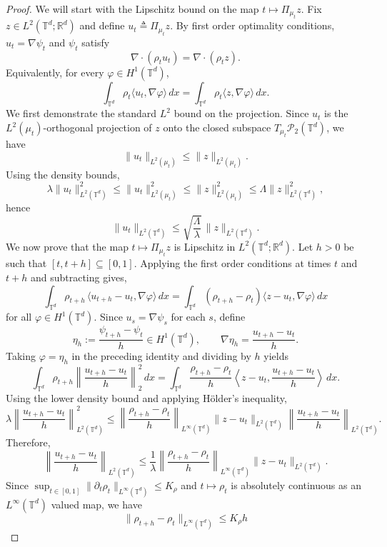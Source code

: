 \documentclass[10pt,a4paper]{amsart}
\begin{document}
\begin{proof}
We will start with the Lipschitz bound on the map $t \mapsto \Pi_{\mu_t}z$. Fix $z\in L^2(\mathbb{T}^d;\mathbb R^d)$ and define $u_t \triangleq \Pi_{\mu_t}z$. By first order optimality conditions, $u_t=\nabla \psi_t$ and $\psi_t$ satisfy
\[
\nabla\cdot(\rho_t u_t) = \nabla\cdot(\rho_t z).
\]
Equivalently, for every $\varphi\in H^1(\mathbb{T}^d)$,
\[
\int_{\mathbb{T}^d} \rho_t \langle u_t,\nabla\varphi\rangle\,dx
=
\int_{\mathbb{T}^d} \rho_t \langle z,\nabla\varphi\rangle\,dx.
\]
We first demonstrate the standard $L^2$ bound on the projection. Since $u_t$ is the
$L^2(\mu_t)$-orthogonal projection of $z$ onto the closed subspace
$T_{\mu_t}\mathcal P_2(\mathbb{T}^d)$, we have
\[
\|u_t\|_{L^2(\mu_t)}\le \|z\|_{L^2(\mu_t)}.
\]
Using the density bounds,
\[
\lambda \|u_t\|_{L^2(\mathbb{T}^d)}^2
\le
\|u_t\|_{L^2(\mu_t)}^2
\le
\|z\|_{L^2(\mu_t)}^2
\le
\Lambda \|z\|_{L^2(\mathbb{T}^d)}^2,
\]
hence
\[
\|u_t\|_{L^2(\mathbb{T}^d)}
\le
\sqrt{\frac{\Lambda}{\lambda}}\,\|z\|_{L^2(\mathbb{T}^d)}.
\]
We now prove that the map $t \mapsto \Pi_{\mu_t}z$ is Lipschitz in $L^2(\mathbb{T}^d; \mathbb{R}^d).$ Let $h > 0$ be such that $[t, t+h] \subseteq [0,1]$. Applying the first order conditions at times $t$ and $t+h$ and subtracting gives,
\[\int_{\mathbb{T}^d}\rho_{t+h} \, \langle u_{t+h} - u_t, \nabla \varphi\rangle \, dx = \int_{\mathbb{T}^d}(\rho_{t+h}-\rho_t)\langle z-u_t, \nabla \varphi \rangle\, dx\]
for all $\varphi \in H^1(\mathbb{T}^d).$ Since $u_s=\nabla\psi_s$ for each $s$, define
\[
\eta_h:=\frac{\psi_{t+h}-\psi_t}{h}\in H^1(\mathbb{T}^d),
\qquad
\nabla\eta_h=\frac{u_{t+h}-u_t}{h}.
\]
Taking $\varphi=\eta_h$ in the preceding identity and dividing by $h$ yields
\[
\int_{\mathbb{T}^d}\rho_{t+h}\left\|\frac{u_{t+h}-u_t}{h}\right\|_2^2\,dx
=
\int_{\mathbb{T}^d}\frac{\rho_{t+h}-\rho_t}{h}
\left\langle z-u_t,\frac{u_{t+h}-u_t}{h}\right\rangle\,dx.
\]
Using the lower density bound and applying H\"older's inequality,
\[
\lambda\left\|\frac{u_{t+h}-u_t}{h}\right\|_{L^2(\mathbb{T}^d)}^2
\le
\left\|\frac{\rho_{t+h}-\rho_t}{h}\right\|_{L^\infty(\mathbb{T}^d)}
\|z-u_t\|_{L^2(\mathbb{T}^d)}
\left\|\frac{u_{t+h}-u_t}{h}\right\|_{L^2(\mathbb{T}^d)}.
\]
Therefore,
\[
\left\|\frac{u_{t+h}-u_t}{h}\right\|_{L^2(\mathbb{T}^d)}
\le
\frac{1}{\lambda}
\left\|\frac{\rho_{t+h}-\rho_t}{h}\right\|_{L^\infty(\mathbb{T}^d)}
\|z-u_t\|_{L^2(\mathbb{T}^d)}.
\]
Since $\sup_{t\in [0,1]}\|\partial_t\rho_t\|_{L^\infty(\mathbb{T}^d)} \leq K_\rho$ and $t \mapsto \rho_t$ is absolutely continuous as an $L^\infty(\mathbb{T}^d)$ valued map, we have
\[\|\rho_{t+h} - \rho_t\|_{L^\infty(\mathbb{T}^d)} \leq K_\rho h\]

\end{proof}
\end{document}
